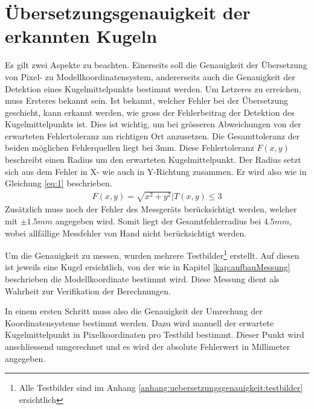 \section{Übersetzungsgenauigkeit der erkannten Kugeln}\label{kap:uebersetzungsgenauigkeit}
Es gilt zwei Aspekte zu beachten. Einerseits soll die Genauigkeit der Übersetzung von Pixel- zu Modellkoordinatensystem,
andererseits auch die Genauigkeit der Detektion eines Kugelmittelpunkts bestimmt werden.
Um Letzeres zu erreichen, muss Ersteres bekannt sein. Ist bekannt, welcher Fehler bei der Übersetzung geschieht, kann
erkannt werden, wie gross der Fehlerbeitrag der Detektion des Kugelmittelpunkts ist. Dies ist wichtig, um bei
grösseren Abweichungen von der erwarteten Fehlertoleranz am richtigen Ort anzusetzen. Die Gesamttoleranz der beiden
möglichen Fehlerquellen liegt bei 3mm. Diese Fehlertoleranz $F(x,y)$ beschreibt einen Radius um den erwarteten Kugelmittelpunkt.
Der Radius setzt sich aus dem Fehler in X- wie auch in Y-Richtung zusammen. Er wird also wie in Gleichung \ref{eq:1} beschrieben.
\begin{align}
    F(x,y) = \sqrt{x^2 + y^2} | T(x,y) \leq 3\label{eq:1}
\end{align}
Zusätzlich muss noch der Fehler des Messgeräts berücksichtigt werden, welcher mit $\pm 1.5mm$ angegeben wird. Somit liegt
der Gesamtfehlerradius bei $4.5mm$, wobei allfällige Messfehler von Hand nicht berücksichtigt werden.

Um die Genauigkeit zu messen, wurden mehrere Testbilder\footnote{Alle Testbilder sind im Anhang \ref{anhang:uebersetzungsgenauigkeit:testbilder} ersichtlich}
erstellt. Auf diesen ist jeweils eine Kugel ersichtlich, von der
wie in Kapitel \ref{kap:aufbauMessung} beschrieben die Modellkoordinate bestimmt wird. Diese Messung dient als Wahrheit zur
Verifikation der Berechnungen.

In einem ersten Schritt muss also die Genauigkeit der Umrechung der Koordinatensysteme bestimmt werden. Dazu wird
manuell der erwartete Kugelmittelpunkt in Pixelkoordinaten pro Testbild bestimmt. Dieser Punkt wird anschliessend
umgerechnet und es wird der absolute Fehlerwert in Millimeter angegeben.

